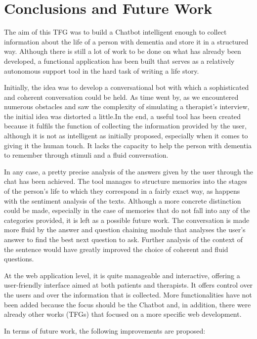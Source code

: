 \chapter{Conclusions and Future Work}
\label{cap:conclusions}

The aim of this TFG was to build a Chatbot intelligent enough to collect information about the life of a person with dementia and store it in a structured way. Although there is still a lot of work to be done on what has already been developed, a functional application has been built that serves as a relatively autonomous support tool in the hard task of writing a life story.

Initially, the idea was to develop a conversational bot with which a sophisticated and coherent conversation could be held. As time went by, as we encountered numerous obstacles and saw the complexity of simulating a therapist's interview, the initial idea was distorted a little.In the end, a useful tool has been created because it fulfils the function of collecting the information provided by the user, although it is not as intelligent as initially proposed, especially when it comes to giving it the human touch. It lacks the capacity to help the person with dementia to remember through stimuli and a fluid conversation.

In any case, a pretty precise analysis of the answers given by the user through the chat has been achieved. The tool manages to structure memories into the stages of the person's life to which they correspond in a fairly exact way, as happens with the sentiment analysis of the texts. Although a more concrete distinction could be made, especially in the case of memories that do not fall into any of the categories provided, it is left as a possible future work. The conversation is made more fluid by the answer and question chaining module that analyses the user's answer to find the best next question to ask. Further analysis of the context of the sentence would have greatly improved the choice of coherent and fluid questions.

At the web application level, it is quite manageable and interactive, offering a user-friendly interface aimed at both patients and therapists. It offers control over the users and over the information that is collected. More functionalities have not been added because the focus should be the Chatbot and, in addition, there were already other works (TFGs) that focused on a more specific web development.

In terms of future work, the following improvements are proposed:


